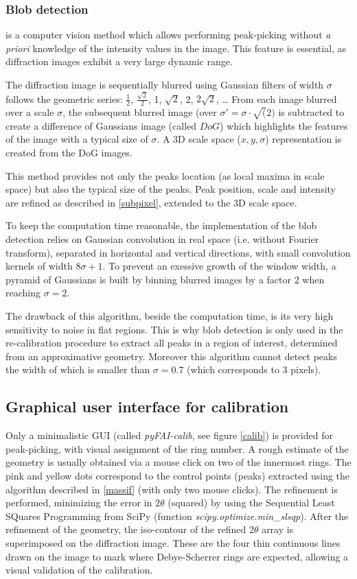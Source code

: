 \documentclass[preprint]{iucr}
\begin{document}
\subsubsection{Blob detection}
\label{blob}
is a computer vision method which allows performing peak-picking without
\textit{a priori} knowledge of the intensity values in the image.
This feature is essential, as diffraction images exhibit a very large
dynamic range.

The diffraction image is sequentially blurred using Gaussian filters of
width $\sigma$ follows the geometric series: $\frac{1}{2}$,
$\frac{\sqrt{2}}{2}$, 1, $\sqrt{2}$, 2, $2\sqrt{2}$, \ldots
From each image blurred over a scale $\sigma$, the subsequent
blurred image (over $\sigma'=\sigma\cdot\sqrt(2)$
is subtracted to create a difference of Gaussians
image (called $DoG$) which highlights the features of the image with a typical
size of $\sigma$.
A 3D scale space ($x,y,\sigma$) representation is created from the DoG
images.

This method provides not only the peaks location (as local maxima in
scale space) but also the typical size of the peaks.
Peak position, scale and intensity are refined as described in
\ref{subpixel}, extended to the 3D scale space.

To keep the computation time reasonable, the implementation of the blob
detection relies on Gaussian convolution in real space (i.e. without Fourier
transform), separated in horizontal and vertical directions, with small
convolution kernels of width $8 \sigma +1$.
To prevent an exessive growth of the window width, a pyramid
of Gaussians is built by binning blurred images by a factor 2 when reaching
$\sigma=2$.

The drawback of this algorithm, beside the computation time, is its very high
sensitivity to noise in flat regions.
This is why blob detection is only used in the re-calibration procedure to
extract all peaks in a region of interest, determined from an
approximative geometry.
Moreover this algorithm cannot detect peaks the width of which is smaller than
$\sigma=0.7$ (which corresponds to 3 pixels).


\subsection{Graphical user interface for calibration}
\label{gui_calib}
Only a minimalistic GUI (called
\textit{pyFAI-calib}, see figure \ref{calib}) is provided
for peak-picking, with visual assignment of the ring number.
A rough estimate of the geometry is usually obtained via a mouse click on
two of the innermost rings.
The pink and yellow dots correspond to the control points (peaks) extracted
using the algorithm described in \ref{massif} (with only two mouse clicks).
The refinement is performed, minimizing the error in $2\theta$ (squared) by
using the Sequential Least SQuares Programming  from
SciPy (function \textit{scipy.optimize.min\_slsqp}).
After the refinement of the geometry, the iso-contour of the refined $2\theta$ array is
superimposed on the diffraction image.
These are the four thin continuous lines
drawn on the image to mark where Debye-Scherrer rings are expected, allowing a visual
validation of the calibration.
\end{document}
